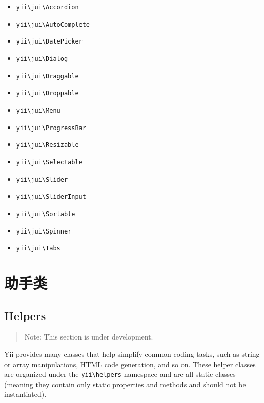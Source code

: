 \begin{itemize}
\item \texttt{yii{\allowbreak{}\textbackslash}jui{\allowbreak{}\textbackslash}Accordion}
\item \texttt{yii{\allowbreak{}\textbackslash}jui{\allowbreak{}\textbackslash}AutoComplete}
\item \texttt{yii{\allowbreak{}\textbackslash}jui{\allowbreak{}\textbackslash}DatePicker}
\item \texttt{yii{\allowbreak{}\textbackslash}jui{\allowbreak{}\textbackslash}Dialog}
\item \texttt{yii{\allowbreak{}\textbackslash}jui{\allowbreak{}\textbackslash}Draggable}
\item \texttt{yii{\allowbreak{}\textbackslash}jui{\allowbreak{}\textbackslash}Droppable}
\item \texttt{yii{\allowbreak{}\textbackslash}jui{\allowbreak{}\textbackslash}Menu}
\item \texttt{yii{\allowbreak{}\textbackslash}jui{\allowbreak{}\textbackslash}ProgressBar}
\item \texttt{yii{\allowbreak{}\textbackslash}jui{\allowbreak{}\textbackslash}Resizable}
\item \texttt{yii{\allowbreak{}\textbackslash}jui{\allowbreak{}\textbackslash}Selectable}
\item \texttt{yii{\allowbreak{}\textbackslash}jui{\allowbreak{}\textbackslash}Slider}
\item \texttt{yii{\allowbreak{}\textbackslash}jui{\allowbreak{}\textbackslash}SliderInput}
\item \texttt{yii{\allowbreak{}\textbackslash}jui{\allowbreak{}\textbackslash}Sortable}
\item \texttt{yii{\allowbreak{}\textbackslash}jui{\allowbreak{}\textbackslash}Spinner}
\item \texttt{yii{\allowbreak{}\textbackslash}jui{\allowbreak{}\textbackslash}Tabs}
\end{itemize}


\chapter{助手类}
\label{helper-overview.md}\section{Helpers}
\begin{quote}Note: This section is under development.

\end{quote}
Yii provides many classes that help simplify common coding tasks, such as string or array manipulations,
HTML code generation, and so on. These helper classes are organized under the \lstinline|yii\helpers| namespace and
are all static classes (meaning they contain only static properties and methods and should not be instantiated).

